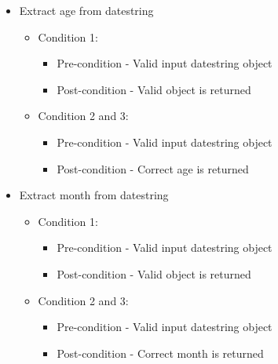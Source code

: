 \documentclass{article}
\begin{document}
\begin{itemize}
\item Extract age from datestring
\begin{itemize}
	\item Condition 1:
	\begin{itemize}
		\item Pre-condition - Valid input datestring object
		\item Post-condition - Valid object is returned
	\end{itemize}
	\item Condition 2 and 3:
	\begin{itemize}
		\item Pre-condition - Valid input datestring object
		\item Post-condition - Correct age is returned
	\end{itemize}

\end{itemize}
\item Extract month from datestring
\begin{itemize}
	\item Condition 1:
	\begin{itemize}
		\item Pre-condition - Valid input datestring object
		\item Post-condition - Valid object is returned
	\end{itemize}
	\item Condition 2 and 3:
	\begin{itemize}
		\item Pre-condition - Valid input datestring object
		\item Post-condition - Correct month is returned
	\end{itemize}

\end{itemize}


\end{itemize}
\end{document}
